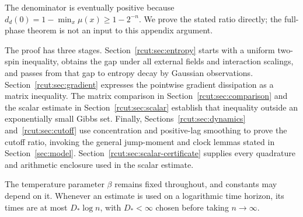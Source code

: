 The denominator is eventually positive because
$d_d(0)=1-\min_x\mu(x)\ge1-2^{-n}$. We prove the stated ratio directly;
the full-phase theorem is not an input to this appendix argument.

The proof has three stages. Section~\ref{rcut:sec:entropy} starts with a
uniform two-spin inequality, obtains the gap under all external fields
and interaction scalings, and passes from that gap to entropy decay by
Gaussian observations. Section~\ref{rcut:sec:gradient} expresses the
pointwise gradient dissipation as a matrix inequality. The matrix
comparison in Section~\ref{rcut:sec:comparison} and the scalar estimate in
Section~\ref{rcut:sec:scalar} establish that inequality outside an
exponentially small Gibbs set. Finally,
Sections~\ref{rcut:sec:dynamics} and~\ref{rcut:sec:cutoff} use concentration
and positive-lag smoothing to prove the cutoff ratio, invoking the
general jump-moment and clock lemmas stated in Section~\ref{sec:model}.
Section~\ref{rcut:sec:scalar-certificate} supplies every quadrature and
arithmetic enclosure used in the scalar estimate.

The temperature parameter $\beta$ remains fixed throughout, and constants
may depend on it. Whenever an estimate is used on a logarithmic time
horizon, its times are at most $D_*\log n$, with $D_*<\infty$ chosen
before taking $n\to\infty$.
